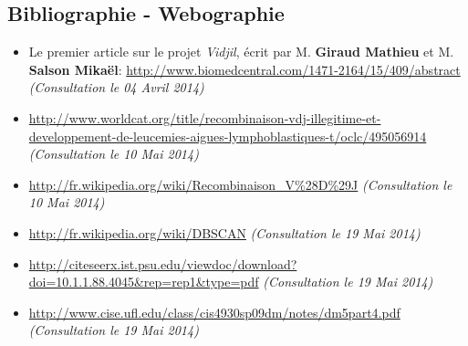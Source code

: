 \documentclass[pdftex,12pt,a4paper]{report}
\begin{document}
\begin{spacing}{1.2}
\chapter*{Bibliographie - Webographie}


\begin{itemize}
\item{Le premier article sur le projet \textit{Vidjil}, écrit par M. \textbf{Giraud Mathieu} et M. \textbf{Salson Mikaël}: \url{http://www.biomedcentral.com/1471-2164/15/409/abstract} \textit{(Consultation le 04 Avril 2014)}}
\item{\url{http://www.worldcat.org/title/recombinaison-vdj-illegitime-et-developpement-de-leucemies-aigues-lymphoblastiques-t/oclc/495056914} \textit{(Consultation le 10 Mai 2014)}}
\item{\url{http://fr.wikipedia.org/wiki/Recombinaison_V%28D%29J} \textit{(Consultation le 10 Mai 2014)}}
\item{\url{http://fr.wikipedia.org/wiki/DBSCAN} \textit{(Consultation le 19 Mai 2014)}}
\item{\url{http://citeseerx.ist.psu.edu/viewdoc/download?doi=10.1.1.88.4045&rep=rep1&type=pdf} \textit{(Consultation le 19 Mai 2014)}}
\item{\url{http://www.cise.ufl.edu/class/cis4930sp09dm/notes/dm5part4.pdf} \textit{(Consultation le 19 Mai 2014)}}
\end{itemize}


\end{spacing}
\end{document}
